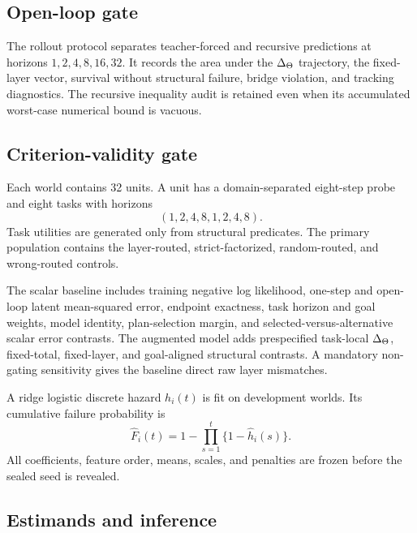 \subsection{Open-loop gate}

The rollout protocol separates teacher-forced and recursive predictions at
horizons \(1,2,4,8,16,32\).  It records the area under the
\(\Delta_{\Theta}\) trajectory, the fixed-layer vector, survival without structural
failure, bridge violation, and tracking diagnostics.  The recursive inequality
audit is retained even when its accumulated worst-case numerical bound is
vacuous.

\subsection{Criterion-validity gate}

Each world contains 32 units.  A unit has a domain-separated eight-step probe
and eight tasks with horizons
\[
(1,2,4,8,1,2,4,8).
\]
Task utilities are generated only from structural predicates.  The primary
population contains the layer-routed, strict-factorized, random-routed, and
wrong-routed controls.

The scalar baseline includes training negative log likelihood, one-step and
open-loop latent mean-squared error, endpoint exactness, task horizon and goal
weights, model identity, plan-selection margin, and selected-versus-alternative
scalar error contrasts.  The augmented model adds prespecified task-local
\(\Delta_{\Theta}\), fixed-total, fixed-layer, and goal-aligned structural
contrasts.  A mandatory non-gating sensitivity gives the baseline direct raw
layer mismatches.

A ridge logistic discrete hazard \(h_i(t)\) is fit on development worlds.  Its
cumulative failure probability is
\[
\widehat F_i(t)
=1-\prod_{s=1}^{t}\{1-\widehat h_i(s)\}.
\]
All coefficients, feature order, means, scales, and penalties are frozen before
the sealed seed is revealed.

\subsection{Estimands and inference}

